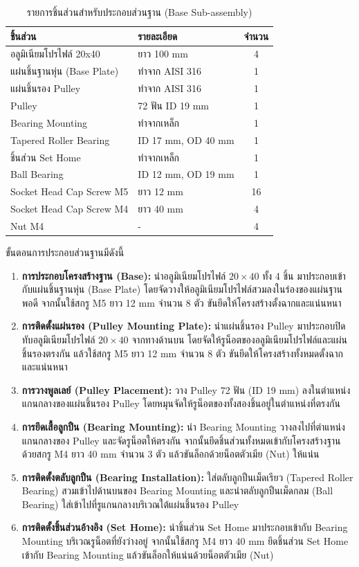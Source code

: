\begin{table}[H]
\centering
\caption{รายการชิ้นส่วนสำหรับประกอบส่วนฐาน (Base Sub-assembly)}
\label{tab:base_parts}
\begin{tabular}{llc}
\toprule
ชิ้นส่วน & รายละเอียด & จำนวน \\
\midrule
อลูมิเนียมโปรไฟล์ 20x40 & ยาว 100 mm & 4 \\
แผ่นชิ้นฐานหุ่น (Base Plate) & ทำจาก AISI 316 & 1 \\
แผ่นชิ้นรอง Pulley & ทำจาก AISI 316 & 1 \\
Pulley & 72 ฟัน ID 19 mm & 1 \\
Bearing Mounting & ทำจากเหล็ก & 1 \\
Tapered Roller Bearing & ID 17 mm, OD 40 mm & 1 \\
ชิ้นส่วน Set Home & ทำจากเหล็ก & 1 \\
Ball Bearing & ID 12 mm, OD 19 mm & 1 \\
Socket Head Cap Screw M5 & ยาว 12 mm & 16 \\
Socket Head Cap Screw M4 & ยาว 40 mm & 4 \\
Nut M4 & - & 4 \\
\bottomrule
\end{tabular}
\end{table}

ขั้นตอนการประกอบส่วนฐานมีดังนี้
\begin{enumerate}
    \item \textbf{การประกอบโครงสร้างฐาน (Base):} นำอลูมิเนียมโปรไฟล์ $20\times40$ ทั้ง 4 ชิ้น มาประกอบเข้ากับแผ่นชิ้นฐานหุ่น (Base Plate) โดยจัดวางให้อลูมิเนียมโปรไฟล์สวมลงในร่องของแผ่นฐานพอดี จากนั้นใช้สกรู M5 ยาว 12 mm จำนวน 8 ตัว ขันยึดให้โครงสร้างตั้งฉากและแน่นหนา
    \item \textbf{การติดตั้งแผ่นรอง (Pulley Mounting Plate):} นำแผ่นชิ้นรอง Pulley มาประกอบปิดทับอลูมิเนียมโปรไฟล์ $20\times40$ จากทางด้านบน โดยจัดให้รูน็อตของอลูมิเนียมโปรไฟล์และแผ่นชิ้นรองตรงกัน แล้วใช้สกรู M5 ยาว 12 mm จำนวน 8 ตัว ขันยึดให้โครงสร้างทั้งหมดตั้งฉากและแน่นหนา
    \item \textbf{การวางพูลเลย์ (Pulley Placement):} วาง Pulley 72 ฟัน (ID 19 mm) ลงในตำแหน่งแกนกลางของแผ่นชิ้นรอง Pulley โดยหมุนจัดให้รูน็อตของทั้งสองชิ้นอยู่ในตำแหน่งที่ตรงกัน
    \item \textbf{การยึดเสื้อลูกปืน (Bearing Mounting):} นำ Bearing Mounting วางลงไปที่ตำแหน่งแกนกลางของ Pulley และจัดรูน็อตให้ตรงกัน จากนั้นยึดชิ้นส่วนทั้งหมดเข้ากับโครงสร้างฐานด้วยสกรู M4 ยาว 40 mm จำนวน 3 ตัว แล้วขันล็อกด้วยน็อตตัวเมีย (Nut) ให้แน่น
    \item \textbf{การติดตั้งตลับลูกปืน (Bearing Installation):} ใส่ตลับลูกปืนเม็ดเรียว (Tapered Roller Bearing) สวมเข้าไปด้านบนของ Bearing Mounting และนำตลับลูกปืนเม็ดกลม (Ball Bearing) ใส่เข้าไปที่รูแกนกลางบริเวณใต้แผ่นชิ้นรอง Pulley
    \item \textbf{การติดตั้งชิ้นส่วนอ้างอิง (Set Home):} นำชิ้นส่วน Set Home มาประกอบเข้ากับ Bearing Mounting บริเวณรูน็อตที่ยังว่างอยู่ จากนั้นใช้สกรู M4 ยาว 40 mm ยึดชิ้นส่วน Set Home เข้ากับ Bearing Mounting แล้วขันล็อกให้แน่นด้วยน็อตตัวเมีย (Nut)
\end{enumerate}


